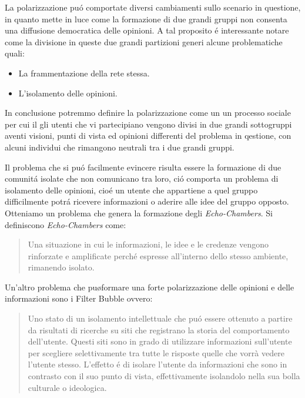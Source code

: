 La polarizzazione pu\'o comportate diversi cambiamenti sullo scenario in questione, in quanto mette in luce come la formazione di due grandi gruppi non consenta una diffusione democratica delle opinioni. A tal proposito \'e interessante notare come la divisione in queste due grandi partizioni generi alcune problematiche quali:
\begin{itemize}
\item La frammentazione della rete stessa.
\item L'isolamento delle opinioni. 
\end{itemize} 

In conclusione potremmo definire la polarizzazione come un un processo sociale per cui il gli utenti che vi partecipiano vengono divisi in due grandi sottogruppi aventi visioni, punti di vista ed opinioni differenti del problema in qestione, con alcuni individui che rimangono neutrali tra i due grandi gruppi.

Il problema che si pu\'o facilmente evincere risulta essere la formazione di due comunit\'a isolate che non comunicano tra loro, ci\'o comporta un problema di isolamento delle opinioni, cio\'e un utente che appartiene a quel gruppo difficilmente potr\'a ricevere informazioni o aderire alle idee del gruppo opposto.
Otteniamo un problema che genera la formazione degli \textit{Echo-Chambers}. Si definiscono \textit{Echo-Chambers} come:
\begin{quote} 
Una situazione in cui le informazioni, le idee e le credenze vengono rinforzate e amplificate perch\'e espresse all'interno dello stesso ambiente, rimanendo isolato.
\end{quote}

Un'altro problema che pu\o formare una forte polarizzazione delle opinioni e delle informazioni sono i Filter Bubble ovvero:

\begin{quote} 
Uno stato di un isolamento intellettuale che pu\'o essere ottenuto a partire da risultati di ricerche su siti che registrano la storia del comportamento dell'utente. Questi siti sono in grado di utilizzare informazioni sull'utente per scegliere selettivamente tra tutte le risposte quelle che vorrà vedere l'utente stesso. L'effetto \'e di isolare l'utente da informazioni che sono in contrasto con il suo punto di vista, effettivamente isolandolo nella sua bolla culturale o ideologica.
\end{quote}

